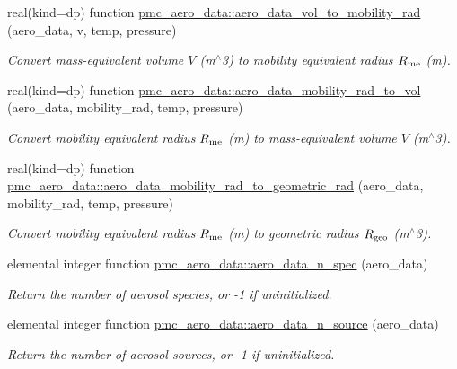 \begin{DoxyCompactItemize}
real(kind=dp) function \mbox{\hyperlink{namespacepmc__aero__data_a11af7aca91af3bd2781a2f42ff6cadb0}{pmc\+\_\+aero\+\_\+data\+::aero\+\_\+data\+\_\+vol\+\_\+to\+\_\+mobility\+\_\+rad}} (aero\+\_\+data, v, temp, pressure)
\begin{DoxyCompactList}\small\item\em Convert mass-\/equivalent volume $V$ (m$^\wedge$3) to mobility equivalent radius $R_{\rm me}$ (m). \end{DoxyCompactList}\item 
real(kind=dp) function \mbox{\hyperlink{namespacepmc__aero__data_a46521ba9e8600f7319bb8387fb39266d}{pmc\+\_\+aero\+\_\+data\+::aero\+\_\+data\+\_\+mobility\+\_\+rad\+\_\+to\+\_\+vol}} (aero\+\_\+data, mobility\+\_\+rad, temp, pressure)
\begin{DoxyCompactList}\small\item\em Convert mobility equivalent radius $R_{\rm me}$ (m) to mass-\/equivalent volume $V$ (m$^\wedge$3). \end{DoxyCompactList}\item 
real(kind=dp) function \mbox{\hyperlink{namespacepmc__aero__data_a423e7cd833b5e231a2b932953cc06d5e}{pmc\+\_\+aero\+\_\+data\+::aero\+\_\+data\+\_\+mobility\+\_\+rad\+\_\+to\+\_\+geometric\+\_\+rad}} (aero\+\_\+data, mobility\+\_\+rad, temp, pressure)
\begin{DoxyCompactList}\small\item\em Convert mobility equivalent radius $R_{\rm me}$ (m) to geometric radius $R_{\rm geo}$ (m$^\wedge$3). \end{DoxyCompactList}\item 
elemental integer function \mbox{\hyperlink{namespacepmc__aero__data_a0ad6e20bd94def8cbbcac7dda7ec3089}{pmc\+\_\+aero\+\_\+data\+::aero\+\_\+data\+\_\+n\+\_\+spec}} (aero\+\_\+data)
\begin{DoxyCompactList}\small\item\em Return the number of aerosol species, or -\/1 if uninitialized. \end{DoxyCompactList}\item 
elemental integer function \mbox{\hyperlink{namespacepmc__aero__data_a270b6c2baba361257005658bc293ecde}{pmc\+\_\+aero\+\_\+data\+::aero\+\_\+data\+\_\+n\+\_\+source}} (aero\+\_\+data)
\begin{DoxyCompactList}\small\item\em Return the number of aerosol sources, or -\/1 if uninitialized. \end{DoxyCompactList}\item 

\end{DoxyCompactItemize}
